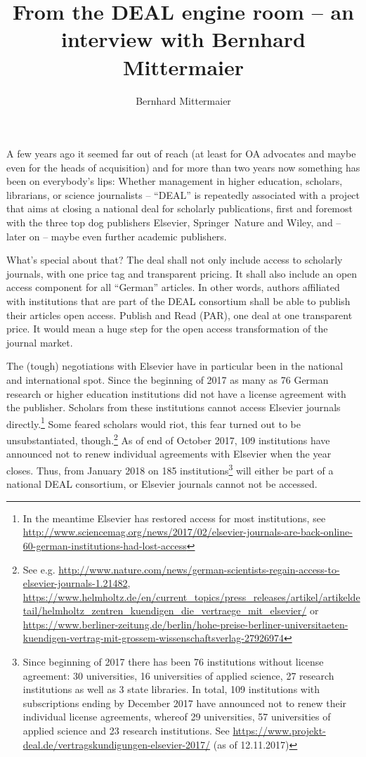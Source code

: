 \documentclass[a4paper,
fontsize=11pt,
oneside,
numbers=noperiodatend,
parskip=half-,
bibliography=totoc,
final
]{scrartcl}
\title{\LARGE{From the DEAL engine room -- an interview with Bernhard Mittermaier}} %
\author{Bernhard Mittermaier} %
\date{}
\begin{document}
\maketitle
\thispagestyle{fancyplain} 


A few years ago it seemed far out of reach (at least for OA advocates
and maybe even for the heads of acquisition) and for more than two years
now something has been on everybody's lips: Whether management in higher
education, scholars, librarians, or science journalists --
\enquote{DEAL} is repeatedly associated with a project that aims at
closing a national deal for scholarly publications, first and foremost
with the three top dog publishers Elsevier, Springer~Nature and Wiley,
and -- later on -- maybe even further academic publishers.

What's special about that? The deal shall not only include access to
scholarly journals, with one price tag and transparent pricing. It shall
also include an open access component for all \enquote{German} articles.
In other words, authors affiliated with institutions that are part of
the DEAL consortium shall be able to publish their articles open access.
Publish and Read (PAR), one deal at one transparent price. It would mean
a huge step for the open access transformation of the journal market.

The (tough) negotiations with Elsevier have in particular been in the
national and international spot. Since the beginning of 2017 as many as
76 German research or higher education institutions did not have a
license agreement with the publisher. Scholars from these institutions
cannot access Elsevier journals directly.\footnote{In the meantime
  Elsevier has restored access for most institutions, see
  \url{http://www.sciencemag.org/news/2017/02/elsevier-journals-are-back-online-60-german-institutions-had-lost-access}}
Some feared scholars would riot, this fear turned out to be
unsubstantiated, though.\footnote{See e.g.
  \url{http://www.nature.com/news/german-scientists-regain-access-to-elsevier-journals-1.21482},
  \url{https://www.helmholtz.de/en/current_topics/press_releases/artikel/artikeldetail/helmholtz_zentren_kuendigen_die_vertraege_mit_elsevier/}
  or
  \url{https://www.berliner-zeitung.de/berlin/hohe-preise-berliner-universitaeten-kuendigen-vertrag-mit-grossem-wissenschaftsverlag-27926974}}
As of end of October 2017, 109 institutions have announced not to renew
individual agreements with Elsevier when the year closes. Thus, from
January 2018 on 185 institutions\footnote{Since beginning of 2017 there
  has been 76 institutions without license agreement: 30 universities,
  16 universities of applied science, 27 research institutions as well
  as 3 state libraries. In total, 109 institutions with subscriptions
  ending by December 2017 have announced not to renew their individual
  license agreements, whereof 29 universities, 57 universities of
  applied science and 23 research institutions. See
  \url{https://www.projekt-deal.de/vertragskundigungen-elsevier-2017/}
  (as of 12.11.2017)} will either be part of a national DEAL consortium,
or Elsevier journals cannot not be accessed.
\end{document}
